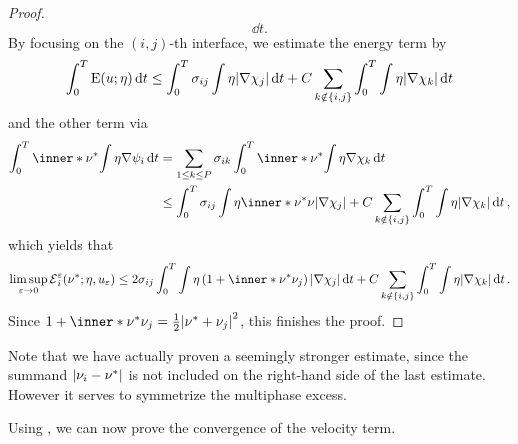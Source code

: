 \begin{proof}
\begin{equation*}
		\dd{ t }.
	\end{equation*}
	By focusing on the $ ( i, j )$-th interface, we estimate the energy term by
	\begin{equation*}
		\int_{ 0 }^{ T }
		\operatorname{E} ( u ; \eta )
		\dd{ t }
		\leq
		\int_{ 0 }^{ T }
		\sigma_{ i j }
		\int
		\eta
		\abs{ \nabla \chi_{ j } }
		\dd{ t }
		+
		C \sum_{ k \notin \{ i , j \} }
		\int_{ 0 }^{ T }
		\int
		\eta
		\abs{ \nabla \chi_{ k } }
		\dd{ t }
	\end{equation*}
	and the other term via
	\begin{align*}
		\int_{ 0 }^{ T }
		\inner*{ \nu^{ \ast } }
		{
			\int
			\eta
			\nabla \psi_{ i }
		}
		\dd{ t }
		& =
		\sum_{ 1 \leq k \leq P }
		\sigma_{ i k }
		\int_{ 0 }^{ T }
		\inner*{ \nu^{ \ast } }
		{
			\int
			\eta 
			\nabla \chi_{ k }
		}
		\dd{ t }
		\\
		& \leq
		\int_{ 0 }^{ T }
		\sigma_{ i j }
		\int
		\eta
		\inner*{ \nu^{ \ast } }{ \nu }
		\abs{ \nabla \chi_{ j } }
		+
		C \sum_{ k \notin \{ i , j \} }
		\int_{ 0 }^{ T }
		\int
		\eta
		\abs{ \nabla \chi_{ k } }
		\dd{ t },
	\end{align*}
	which yields that
	\begin{equation*}
		\limsup_{ \varepsilon \to 0 }
		\tilt_excess_{ i }^{ \varepsilon } ( \nu^{ \ast } ; \eta , u_{ 
			\varepsilon } )
		\leq
		2 \sigma_{ i j } \int_{ 0 }^{ T }
		\int
		\eta
		\left( 1 + \inner*{ \nu^{ \ast } }{ \nu_{ j } } \right)
		\abs{ \nabla \chi_{ j } }
		\dd{ t }
		+
		C \sum_{ k \notin \{ i , j \} }
		\int_{ 0 }^{ T }
		\int
		\eta 
		\abs{ \nabla \chi_{ k } }
		\dd{ t }.
	\end{equation*}
	Since $ 1 + \inner*{ \nu^{ \ast } }{ \nu_{ j } } = \frac{ 1 }{ 2 } \abs{ 
		\nu^{ \ast } + \nu_{ j } }^{ 2 } $, this finishes the proof.
\end{proof}

Note that we have actually proven a seemingly stronger estimate, since the 
summand $ \abs{ \nu_{ i } - \nu^{ \ast } } $ is not included on the right-hand 
side of the last estimate. However it serves to symmetrize the multiphase 
excess.

Using , we can 
now prove the convergence of the velocity term.

